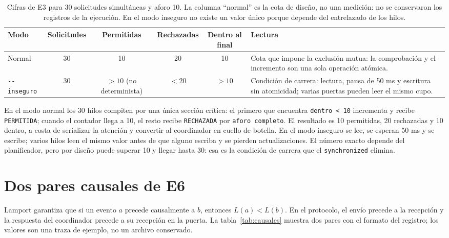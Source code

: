 \documentclass[10pt]{article}
\newcommand{\cod}[1]{\texttt{#1}}
\begin{document}
\begin{table}[H]
\centering
\small
\renewcommand{\arraystretch}{1.2}
\begin{tabularx}{\textwidth}{@{}l c c c c X@{}}
\toprule
\textbf{Modo} & \textbf{Solicitudes} & \textbf{Permitidas} &
\textbf{Rechazadas} & \textbf{Dentro al final} & \textbf{Lectura} \\
\midrule
Normal & 30 & 10 & 20 & 10 &
Cota que impone la exclusión mutua: la comprobación y el incremento son una
sola operación atómica. \\
\addlinespace
\cod{-{}-inseguro} & 30 & $>10$ (no determinista) & $<20$ & $>10$ &
Condición de carrera: lectura, pausa de 50 ms y escritura sin atomicidad;
varias puertas pueden leer el mismo cupo. \\
\bottomrule
\end{tabularx}
\caption{Cifras de E3 para 30 solicitudes simultáneas y aforo 10. La columna
``normal'' es la cota de diseño, no una medición: no se conservaron los
registros de la ejecución. En el modo inseguro no existe un valor único porque
depende del entrelazado de los hilos.}
\label{tab:e3}
\end{table}

En el modo normal los 30 hilos compiten por una única sección crítica: el
primero que encuentra \cod{dentro < 10} incrementa y recibe \cod{PERMITIDA};
cuando el contador llega a 10, el resto recibe \cod{RECHAZADA} por
\cod{aforo completo}. El resultado es 10 permitidas, 20 rechazadas y 10 dentro,
a costa de serializar la atención y convertir al coordinador en cuello de
botella. En el modo inseguro se lee, se esperan 50 ms y se escribe; varios
hilos leen el mismo valor antes de que alguno escriba y se pierden
actualizaciones. El número exacto depende del planificador, pero por diseño
puede superar 10 y llegar hasta 30: esa es la condición de carrera que el
\cod{synchronized} elimina.

\section{Dos pares causales de E6}

Lamport garantiza que si un evento $a$ precede causalmente a $b$, entonces
$L(a) < L(b)$. En el protocolo, el envío precede a la recepción y la respuesta
del coordinador precede a su recepción en la puerta. La
tabla~\ref{tab:causales} muestra dos pares con el formato del registro; los
valores son una traza de ejemplo, no un archivo conservado.
\end{document}
